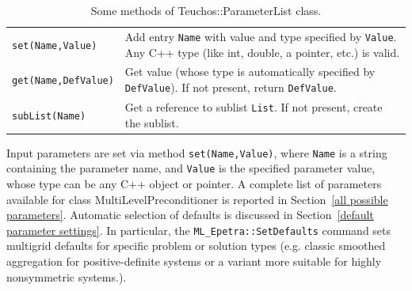 \documentclass{article}[11pt]
\begin{document}
\begin{table}[htbp]
  \centering
  \begin{tabular}{| p{4cm} | p{10cm} |}
    \hline
    \verb!set(Name,Value)! & Add entry \verb!Name! with value and type
    specified by \verb!Value!. Any C++ type (like int, double, a
    pointer, etc.) is valid. \\
    \verb!get(Name,DefValue)! & Get value (whose type is automatically
    specified by \verb!DefValue!). If not present, return
    \verb!DefValue!. \\
    \verb!subList(Name)! & Get a reference to sublist \verb!List!. If not
    present, create the sublist. \\
    \hline
  \end{tabular}
  \caption{Some methods of Teuchos::ParameterList class.}
  \label{tab:teuchos}
\end{table}

Input parameters are set via method \verb!set(Name,Value)!, where
\verb!Name! is a string containing the parameter name, and \verb!Value! is the
specified parameter value, whose type can be any C++ object or pointer. 
A complete list of parameters available for class MultiLevelPreconditioner is
reported in Section~\ref{all possible parameters}.  Automatic selection of defaults 
is discussed in Section~\ref{default parameter settings}.
In particular, the \verb!ML_Epetra::SetDefaults! command sets multigrid defaults 
for specific problem or solution types (e.g. classic smoothed aggregation for 
positive-definite systems or a variant more suitable for highly nonsymmetric systems.).
\end{document}
